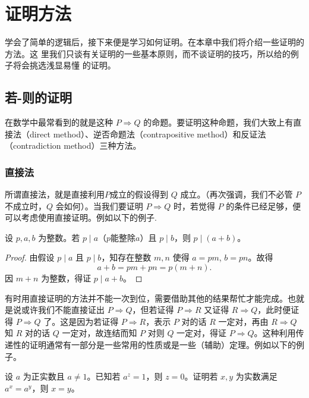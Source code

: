 

\chapter{证明方法}

学会了简单的逻辑后，接下来便是学习如何证明。在本章中我们将介绍一些证明的方法。这
里我们只谈有关证明的一些基本原则，而不谈证明的技巧，所以给的例子将会挑选浅显易懂
的证明。

\section{若-则的证明}

在数学中最常看到的就是这种 $P \Rightarrow Q$ 的命题。要证明这种命题，我们大致上有直接法（direct method）、逆否命题法（contrapositive method）和反证法（contradiction method）三种方法。

\subsection{直接法}

所谓直接法，就是直接利用$P$成立的假设得到 $Q$ 成立。（再次强调，我们不必管 $P$ 不成立时，$Q$ 会如何）。当我们要证明 $P \Rightarrow Q$
时，若觉得 $P$ 的条件已经足够，便可以考虑使用直接证明。例如以下的例子.

\begin{example}
设 $p,a,b$ 为整数。若 $p \mid a$（$p$能整除$a$）且 $p \mid b$，则 $p \mid (a+b)$。
\end{example}

\begin{proof}
由假设 $p \mid a$ 且 $p \mid b$，知存在整数 $m,n$ 使得 $a = pm$, $b = pn$。故得
$$a + b = pm + pn = p(m + n).$$
因 $m + n$ 为整数，得证 $p \mid a + b$。
\end{proof}

有时用直接证明的方法并不能一次到位，需要借助其他的结果帮忙才能完成。也就是说或许我们不能直接证出 $P\Rightarrow Q$，但若证得 $P\Rightarrow R$ 又证得 $R\Rightarrow Q$，此时便证得 $P\Rightarrow Q$ 了。这是因为若证得 $P\Rightarrow R$，表示 $P$ 对的话 $R$ 一定对，再由 $R\Rightarrow Q$ 知 $R$ 对的话 $Q$ 一定对，故连结而知 $P$ 对则 $Q$ 一定对，得证 $P\Rightarrow Q$。这种利用传递性的证明通常有一部分是一些常用的性质或是一些（辅助）定理。例如以下的例子。

\begin{example}
设 $a$ 为正实数且 $a\neq 1$。已知若 $a^{z} = 1$，则 $z = 0$。证明若 $x,y$ 为实数满足 $a^{x} = a^{y}$，则 $x = y$。
\end{example}

